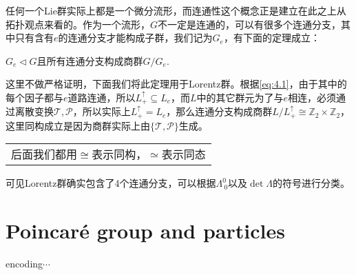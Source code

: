 任何一个Lie群实际上都是一个微分流形，而连通性这个概念正是建立在此之上从拓扑观点来看的。作为一个流形，$G$不一定是连通的，可以有很多个连通分支，其中只有含有$e$的连通分支才能构成子群，我们记为$G_e$，有下面的定理成立：
\begin{theorem}
	$G_e\lhd G$且所有连通分支构成商群$G/G_e$.
\end{theorem}
这里不做严格证明，下面我们将此定理用于Lorentz群。根据\ref{eq:4.1}，由于其中的每个因子都与$e$道路连通，所以$L^\uparrow_+\subseteq L_e$，而$L$中的其它群元为了与$e$相连，必须通过离散变换$\mathcal{T},\mathcal{P}$，所以实际上$L^\uparrow_+=L_e$，那么连通分支构成商群$L/L^\uparrow_+\cong \mathbb{Z}_2\times\mathbb{Z}_2$，这里同构成立是因为商群实际上由$\{\mathcal{T},\mathcal{P}\}$生成。
\begin{margintable}\footnotesize 
	\begin{tabularx}{\marginparwidth}{|X}
		后面我们都用$\cong$表示同构，$\simeq$表示同态
	\end{tabularx}
\end{margintable}

可见Lorentz群确实包含了4个连通分支，可以根据$\Lambda^0_{\ 0}$以及$\det \Lambda$的符号进行分类。
\section{Poincar\'e group and particles}
encoding$\cdots$

